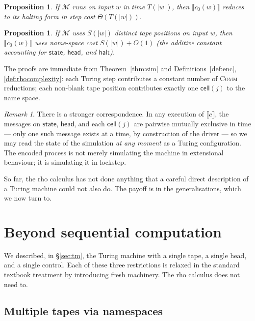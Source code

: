 \documentclass[11pt]{article}
\theoremstyle{plain}
\newtheorem{proposition}[theorem]{Proposition}
\theoremstyle{definition}
\theoremstyle{remark}
\newtheorem{remark}[theorem]{Remark}
\newcommand{\sembrack}[1]{\llbracket #1 \rrbracket}
\newcommand{\TM}{\mathcal{M}}
\newcommand{\Cell}{\mathsf{cell}}
\newcommand{\Head}{\mathsf{head}}
\newcommand{\St}{\mathsf{state}}
\newcommand{\Halt}{\mathsf{halt}}
\begin{document}
\begin{proposition}\label{prop:time}
If $\TM$ runs on input $w$ in time $T(|w|)$, then $\sembrack{c_0(w)}$
reduces to its halting form in step cost $\Theta(T(|w|))$.
\end{proposition}

\begin{proposition}\label{prop:space}
If $\TM$ uses $S(|w|)$ distinct tape positions on input $w$, then
$\sembrack{c_0(w)}$ uses name-space cost $S(|w|) + O(1)$ (the additive
constant accounting for $\St$, $\Head$, and $\Halt$).
\end{proposition}

\noindent The proofs are immediate from Theorem~\ref{thm:sim} and
Definitions~\ref{def:enc}, \ref{def:rhocomplexity}: each Turing step
contributes a constant number of \textsc{Comm} reductions; each
non-blank tape position contributes exactly one $\Cell(j)$ to the name
space.

\begin{remark}
There is a stronger correspondence. In any execution of $\sembrack{c}$,
the messages on $\St$, $\Head$, and each $\Cell(j)$ are pairwise mutually
exclusive in time --- only one such message exists at a time, by
construction of the driver --- so we may read the state of the simulation
\emph{at any moment} as a Turing configuration. The encoded process is
not merely simulating the machine in extensional behaviour; it is
simulating it in lockstep.
\end{remark}

So far, the rho calculus has not done anything that a careful direct
description of a Turing machine could not also do. The payoff is in the
generalisations, which we now turn to.

\section{Beyond sequential computation}\label{sec:beyond}

We described, in \S\ref{sec:tm}, the Turing machine with a single tape,
a single head, and a single control. Each of these three restrictions is
relaxed in the standard textbook treatment by introducing fresh machinery.
The rho calculus does not need to.

\subsection{Multiple tapes via namespaces}\label{sec:multitape}
\end{document}
